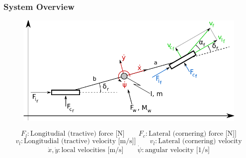 \documentclass{beamer}
\begin{document}
\begin{frame}
\frametitle{System Overview}

\begin{figure} [h]
\begin{center}
\includegraphics[scale=0.8]{images/dynamics_overview.pdf}
\label{fig:pendel}
\end{center}
\end{figure}
\[F_l : \text{Longitudial (tractive) force [N]} \qquad F_c : \text{Lateral
(cornering) force [N]]}\] \[v_l : \text{Longitudial (tractive) velocity [m/s]]}
\qquad v_l : \text{Lateral (cornering) velocity}\] \[\dot{x}, \dot{y} :
\text{local velocities [m/s]} \qquad \dot{\psi} :
\text{angular velocity [1/s]}\]

\end{frame}
\end{document}
